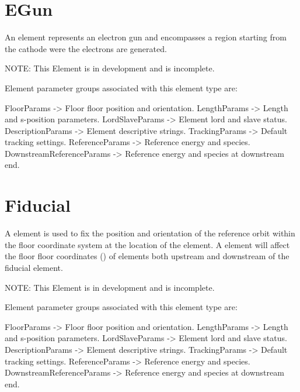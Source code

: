 \section{EGun}
\label{s:egun}

An  element represents an electron gun and encompasses a region starting from the cathode
were the electrons are generated.  

NOTE: This Element is in development and is incomplete.

Element parameter groups associated with this element type are:
\TOPrule
\begin{example}
  FloorParams -> Floor floor position and orientation.  
  LengthParams        -> Length and s-position parameters.  
  LordSlaveParams     -> Element lord and slave status.  
  DescriptionParams   -> Element descriptive strings.  
  TrackingParams      -> Default tracking settings.  
  ReferenceParams     -> Reference energy and species. 
  DownstreamReferenceParams -> Reference energy and species at downstream end. 
\end{example}
\BOTTOMrule

\section{Fiducial}
\label{s:fiducial}

A  element is used to fix the position and orientation of the reference orbit within
the floor coordinate system at the location of the  element. A  element
will affect the floor floor coordinates () of elements both upstream and downstream
of the fiducial element.

NOTE: This Element is in development and is incomplete.

Element parameter groups associated with this element type are:
\TOPrule
\begin{example}
  FloorParams -> Floor floor position and orientation.  
  LengthParams        -> Length and s-position parameters.  
  LordSlaveParams     -> Element lord and slave status.  
  DescriptionParams   -> Element descriptive strings.  
  TrackingParams      -> Default tracking settings.  
  ReferenceParams     -> Reference energy and species. 
  DownstreamReferenceParams -> Reference energy and species at downstream end. 
\end{example}
\BOTTOMrule


